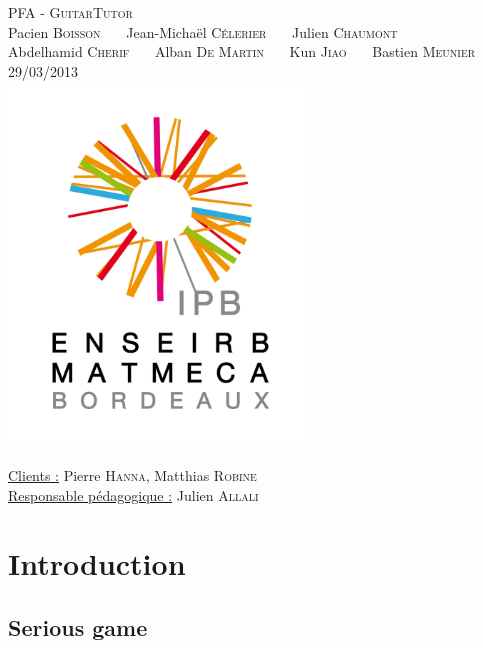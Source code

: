 \documentclass[a4paper,11pt]{article}
\begin{document}
\begin{titlepage}
  \begin{center}

    \textsc{\LARGE PFA - GuitarTutor}\\[2cm]
    Pacien \textsc{Boisson} \ \ \ Jean-Michaël \textsc{Célerier}  \ \ \ Julien \textsc{Chaumont}\\
    Abdelhamid \textsc{Cherif} \ \ \ Alban \textsc{De Martin} \ \ \ Kun \textsc{Jiao} \ \ \ Bastien \textsc{Meunier} \\[3cm]
    \textsc{\large 29/03/2013 }\\[1.5cm]
    \includegraphics[width=8cm]{logo.png}

  \end{center}
  \vspace{3cm}
  \begin{flushleft}
   \underline{Clients :} Pierre \textsc{Hanna}, Matthias \textsc{Robine}\\
   \underline{Responsable pédagogique :} Julien \textsc{Allali}
  \end{flushleft}


\end{titlepage}

\clearpage

\section*{Introduction}

\subsection*{Serious game}
\end{document}
